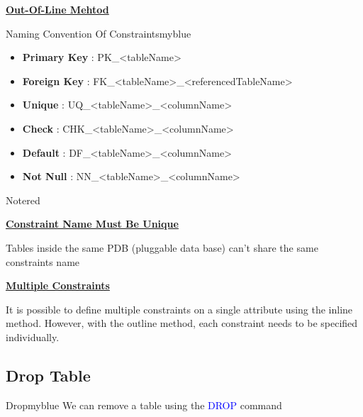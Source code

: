 \vspace{0.5cm}
\textbf{\underline{Out-Of-Line Mehtod}}

\vspace{0.25cm}


\vspace{1cm}
\begin{prettyBox}{Naming Convention Of Constraints}{myblue}
  \begin{itemize}
        \item  \textbf{Primary Key} : PK\_\textless tableName\textgreater  
        \item  \textbf{Foreign Key} : FK\_\textless tableName\textgreater\_\textless referencedTableName\textgreater
        \item  \textbf{Unique} : UQ\_\textless tableName\textgreater\_\textless columnName\textgreater
        \item  \textbf{Check} : CHK\_\textless tableName\textgreater\_\textless columnName\textgreater
        \item  \textbf{Default} : DF\_\textless tableName\textgreater\_\textless columnName\textgreater
        \item  \textbf{Not Null} : NN\_\textless tableName\textgreater\_\textless columnName\textgreater
    \end{itemize}   
\end{prettyBox}

\begin{prettyBox}{Note}{red}

    \textbf{\underline{Constraint Name Must Be Unique}}

\vspace{0.15cm}
Tables inside the same PDB (pluggable data base) can't share the same constraints name

\vspace{0.25cm}
\textbf{\underline{Multiple Constraints}}

\vspace{0.15cm}
It is possible to define multiple constraints on a single attribute using the inline method. 
However, with the outline method, each constraint needs to be specified individually.

\end{prettyBox}


\subsection{Drop Table}
\begin{prettyBox}{Drop}{myblue}
    We can remove a table using the \textcolor{blue}{DROP} command
\end{prettyBox}

